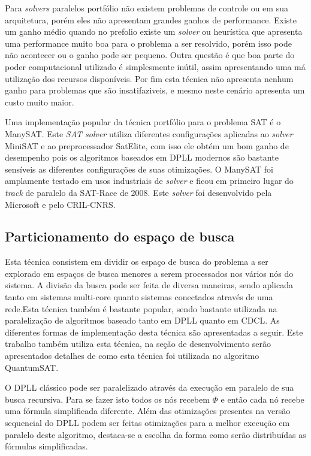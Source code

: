 \documentclass{ufsc-thesis}
\begin{document}
Para \textit{solvers} paralelos portfólio não existem problemas de controle ou em 
sua arquitetura, porém eles não apresentam grandes ganhos de performance. Existe um 
ganho médio quando no prefolio existe um \textit{solver} ou heurística que apresenta 
uma performance muito boa para o problema a ser resolvido, porém isso pode não acontecer ou 
o ganho pode ser pequeno. Outra questão é que boa parte do poder computacional utilizado 
é simplesmente inútil, assim apresentando uma má utilização dos recursos disponíveis. Por 
fim esta técnica não apresenta nenhum ganho para problemas que são insatifaziveis, e mesmo 
neste cenário apresenta um custo muito maior.

Uma implementação popular da técnica portfólio para o problema SAT é o ManySAT\cite{Hamadi09manysat}. 
Este \textit{SAT solver} utiliza diferentes configurações aplicadas ao \textit{solver} 
MiniSAT e ao preprocessador SatElite, com isso ele obtém um bom ganho de desempenho 
pois os algoritmos baseados em DPLL modernos são bastante sensíveis as diferentes 
configurações de suas otimizações. O ManySAT foi amplamente testado em usos industriais 
de \textit{solver} e ficou em primeiro lugar do \textit{track} de paralelo da SAT-Race de 2008.
Este \textit{solver} foi desenvolvido pela Microsoft e pelo CRIL-CNRS.

\subsection{Particionamento do espaço de busca}

Esta técnica consistem em dividir os espaço de busca do problema a ser explorado em espaços de 
busca menores a serem processados nos vários nós do sistema. A divisão da busca pode ser feita 
de diversa maneiras, sendo aplicada tanto em sistemas multi-core quanto sistemas conectados 
através de uma rede.Esta técnica também é bastante popular, sendo bastante utilizada na paralelização 
de algoritmos baseado tanto em DPLL quanto em CDCL. As diferentes formas de implementação desta 
técnica são apresentadas a seguir. Este trabalho também utiliza esta técnica, na seção de desenvolvimento 
serão apresentados detalhes de como esta técnica foi utilizada no algoritmo QuantumSAT.

O DPLL clássico pode ser paralelizado através da execução em paralelo de sua busca recursiva. 
Para se fazer isto todos os nós recebem $\Phi$ e então cada nó recebe uma fórmula simplificada 
diferente. Além das otimizações presentes na versão sequencial do DPLL podem ser feitas 
otimizações para a melhor execução em paralelo deste algoritmo, destaca-se a escolha 
da forma como serão distribuídas as fórmulas simplificadas.
\end{document}
